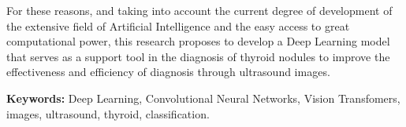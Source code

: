 For these reasons, and taking into account the current degree of development of the extensive field of Artificial Intelligence and the easy access to great computational power, this research proposes to develop a Deep Learning model that serves as a support tool in the diagnosis of thyroid nodules to improve the effectiveness and efficiency of diagnosis through ultrasound images.
\newline

\textbf{Keywords: } Deep Learning, Convolutional Neural Networks, Vision Transfomers, images, ultrasound, thyroid, classification.